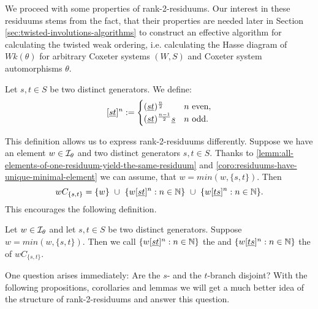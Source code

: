 We proceed with some properties of rank-2-residuums. Our interest in these residuums stems from the fact, that their properties are needed later in Section \ref{sec:twisted-involutions-algorithms} to construct an effective algorithm for calculating the twisted weak ordering, i.e. calculating the Hasse diagram of $Wk(\theta)$ for arbitrary Coxeter systems $(W,S)$ and Coxeter system automorphisms $\theta$.

\begin{defi}
	Let $s,t \in S$ be two distinct generators. We define:
	$$[\underline{s} \underline{t}]^n :=
	\begin{cases}
	(\underline{s} \underline{t})^{\frac{n}{2}} & n \textrm{ even}, \\
	(\underline{s} \underline{t})^{\frac{n-1}{2}} \underline{s} & n \textrm{ odd}. 
	\end{cases}$$
\end{defi}

This definition allows us to express rank-2-residuums differently. Suppose we have an element $w \in \mathcal{I}_{\theta}$ and two distinct generators $s,t \in S$. Thanks to \ref{lemm:all-elements-of-one-residuum-yield-the-same-residuum} and \ref{coro:residuums-have-unique-minimal-element} we can assume, that $w = min(w,\{s,t\})$. Then
$$ wC_{\{s,t\}} = \{ w \} \ \cup \ \{ w [\underline{s} \underline{t}]^n : n \in \mathbb{N} \} \ \cup \ \{ w [\underline{t} \underline{s}]^n : n \in \mathbb{N} \}. $$
This encourages the following definition.

\begin{defi}
	Let $w \in \mathcal{I}_{\theta}$ and let $s,t \in S$ be two distinct generators. Suppose $w = min(w,\{s,t\})$. Then we call $\{ w [\underline{s} \underline{t}]^n : n \in \mathbb{N} \}$ the  and $\{ w [\underline{t} \underline{s}]^n : n \in \mathbb{N} \}$ the  of $wC_{\{s,t\}}$.
\end{defi}

One question arises immediately: Are the $s$- and the $t$-branch disjoint? With the following propositions, corollaries and lemmas we will get a much better idea of the structure of rank-2-residuums and answer this question.

